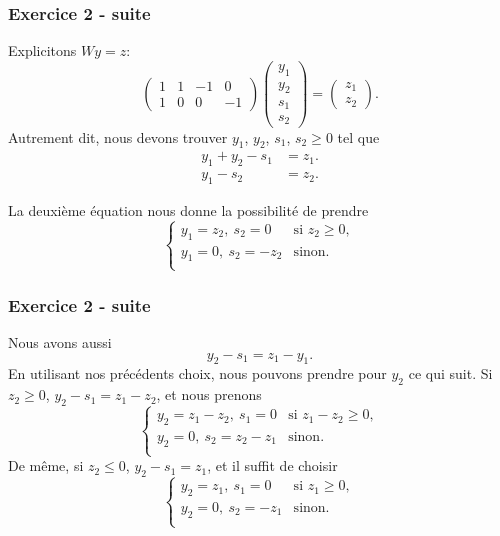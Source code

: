 \begin{frame}
	\frametitle{Exercice 2 - suite}
	
	Explicitons $Wy = z$:
	\[
	\begin{pmatrix}
	1 & 1 & -1 & 0 \\
	1 & 0 & 0  & -1
	\end{pmatrix}
	\begin{pmatrix} y_1 \\ y_2 \\ s_1 \\ s_2 \end{pmatrix} =
	\begin{pmatrix} z_1 \\ z_2 \end{pmatrix}.
	\]
	Autrement dit, nous devons trouver $y_1$, $y_2$, $s_1$, $s_2 \geq 0$
	tel que
	\begin{align*}
	y_1 + y_2 - s_1 &= z_1. \\
	y_1 - s_2 &= z_2.
	\end{align*}
	
	La deuxième équation nous donne la possibilité de prendre
	\[
	\begin{cases}
	y_1 = z_2,\ s_2 = 0 & \mbox{si } z_2 \geq 0,\\
	y_1 = 0,\ s_2 = -z_2 & \mbox{sinon}.\\
	\end{cases}
	\]
	
\end{frame}

\begin{frame}
	\frametitle{Exercice 2 - suite}
	
	Nous avons aussi
	\[
	y_2 - s_1 = z_1 - y_1.
	\]
	En utilisant nos précédents choix, nous pouvons prendre pour $y_2$ ce
	qui suit. Si $z_2 \geq 0$, $y_2 - s_1 = z_1 - z_2$, et nous prenons
	\[
	\begin{cases}
	y_2 = z_1-z_2,\ s_1 = 0 & \mbox{si } z_1-z_2 \geq 0,\\
	y_2 = 0,\ s_2 = z_2-z_1 & \mbox{sinon}.\\
	\end{cases}
	\]
	De même, si $z_2 \leq 0$, $y_2 - s_1 = z_1$, et il suffit de choisir
	\[
	\begin{cases}
	y_2 = z_1,\ s_1 = 0 & \mbox{si } z_1 \geq 0,\\
	y_2 = 0,\ s_2 = -z_1 & \mbox{sinon}.\\
	\end{cases}
	\]
	
\end{frame}

